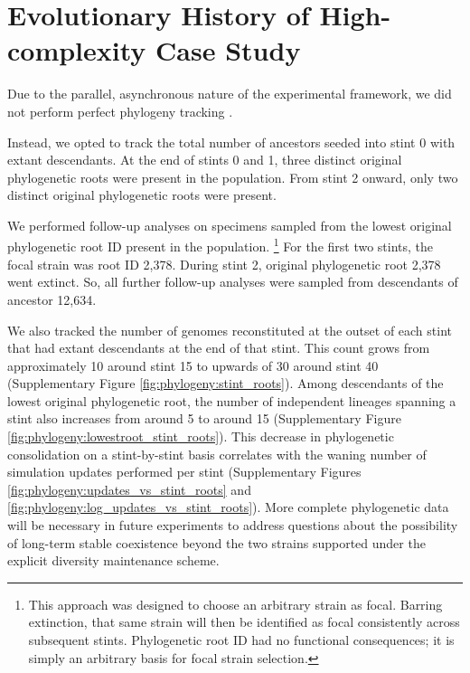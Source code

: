 \section{Evolutionary History of High-complexity Case Study}
\label{sec:history}

Due to the parallel, asynchronous nature of the experimental framework, we did not perform perfect phylogeny tracking \citep{moreno2024analysis}.

Instead, we opted to track the total number of ancestors seeded into stint 0 with extant descendants.
At the end of stints 0 and 1, three distinct original phylogenetic roots were present in the population.
From stint 2 onward, only two distinct original phylogenetic roots were present.

We performed follow-up analyses on specimens sampled from the lowest original phylogenetic root ID present in the population.%
\footnote{
This approach was designed to choose an arbitrary strain as focal.
Barring extinction, that same strain will then be identified as focal consistently across subsequent stints.
Phylogenetic root ID had no functional consequences; it is simply an arbitrary basis for focal strain selection.
}
For the first two stints, the focal strain was root ID 2,378.
During stint 2, original phylogenetic root 2,378 went extinct.
So, all further follow-up analyses were sampled from descendants of ancestor 12,634.

We also tracked the number of genomes reconstituted at the outset of each stint that had extant descendants at the end of that stint.
This count grows from approximately 10 around stint 15 to upwards of 30 around stint 40 (Supplementary Figure \ref{fig:phylogeny:stint_roots}).
Among descendants of the lowest original phylogenetic root, the number of independent lineages spanning a stint also increases from around 5 to around 15
(Supplementary Figure \ref{fig:phylogeny:lowestroot_stint_roots}).
This decrease in phylogenetic consolidation on a stint-by-stint basis correlates with the waning number of simulation updates performed per stint (Supplementary Figures \ref{fig:phylogeny:updates_vs_stint_roots} and \ref{fig:phylogeny:log_updates_vs_stint_roots}).
More complete phylogenetic data will be necessary in future experiments to address questions about the possibility of long-term stable coexistence beyond the two strains supported under the explicit diversity maintenance scheme.

